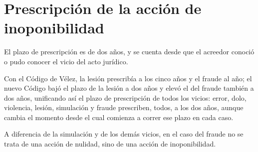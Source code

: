 \documentclass[12pt,oneside]{book}
\begin{document}
\section{Prescripción de la acción de inoponibilidad}

El plazo de prescripción es de dos años, y se cuenta desde que el acreedor conoció o pudo conocer el vicio del acto jurídico.

\begin{important}
Con el Código de Vélez, la lesión prescribía a los cinco años y el fraude al año; el nuevo Código bajó el plazo de la lesión a dos años y elevó el del fraude también a dos años, unificando así el plazo de prescripción de todos los vicios: error, dolo, violencia, lesión, simulación y fraude prescriben, todos, a los dos años, aunque cambia el momento desde el cual comienza a correr ese plazo en cada caso.
\end{important}

A diferencia de la simulación y de los demás vicios, en el caso del fraude no se trata de una acción de nulidad, sino de una acción de inoponibilidad.

\end{document}
